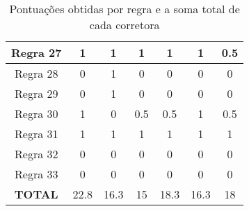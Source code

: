 \begin{table}[h]
\begin{tabular}{|c|c|c|c|c|c|c|}
        Regra 27        & 1                & 1                & 1                 & 1                 & 1                & 0.5            \\ \hline
        Regra 28        & 0                & 1                & 0                 & 0                 & 0                & 0              \\ \hline
        Regra 29        & 0                & 1                & 0                 & 0                 & 0                & 0              \\ \hline
        Regra 30        & 1                & 0                & 0.5               & 0.5               & 1                & 0.5            \\ \hline
        Regra 31        & 1                & 1                & 1                 & 1                 & 1                & 1              \\ \hline
        Regra 32        & 0                & 0                & 0                 & 0                 & 0                & 0              \\ \hline
        Regra 33        & 0                & 0                & 0                 & 0                 & 0                & 0              \\ \hline
        \textbf{TOTAL}  & 22.8             & 16.3             & 15                & 18.3              & 16.3             & 18             \\ \hline
    \end{tabular}
    \caption{Pontuações obtidas por regra e a soma total de cada corretora}
    \label{tab:my-table}
\end{table}
